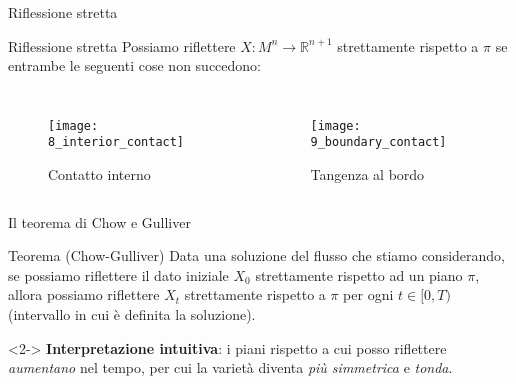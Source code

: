 \begin{frame}{Riflessione stretta}{}
	\begin{block}{Riflessione stretta}
		 Possiamo riflettere $X : M^n \rightarrow \mathbb{R}^{n+1}$ strettamente rispetto a $\pi$ se entrambe le seguenti cose non succedono:
	\end{block}


	\begin{columns}
		\begin{figure}
			\begin{center}
				\texttt{[image: 8\_interior\_contact]}
				\caption{Contatto interno}
			\end{center}
		\end{figure}
		\begin{figure}
			\begin{center}
				\texttt{[image: 9\_boundary\_contact]}
				\caption{Tangenza al bordo}
			\end{center}
		\end{figure}
	\end{columns}
\end{frame}




\begin{frame}{Il teorema di Chow e Gulliver}{}
	\begin{block}{Teorema (Chow-Gulliver)}
		Data una soluzione del flusso che stiamo considerando, se possiamo riflettere il dato iniziale $X_0$ strettamente rispetto ad un piano $\pi$, allora possiamo riflettere $X_t$ strettamente rispetto a $\pi$ per ogni $t\in [0,T)$ (intervallo in cui è definita la soluzione). 
	\end{block}
	\begin{block}{}<2->
		\textbf{Interpretazione intuitiva}: i piani rispetto a cui posso riflettere \textit{aumentano} nel tempo, per cui la varietà diventa \textit{più simmetrica} e \textit{tonda}. 
	\end{block}
\end{frame}
